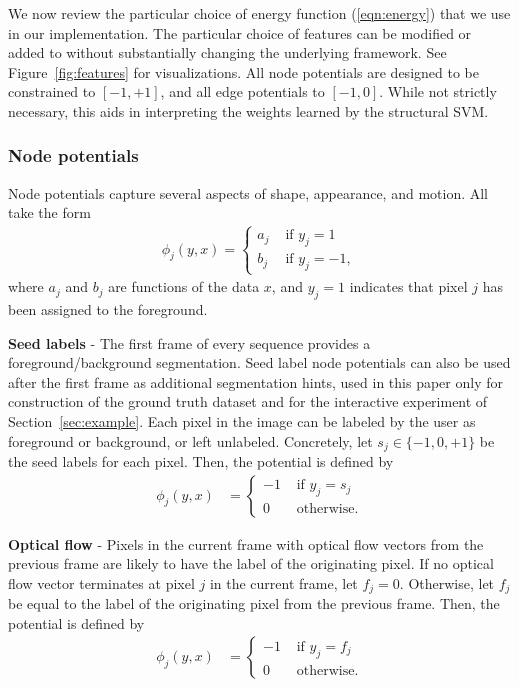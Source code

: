 \documentclass[journal]{IEEEtran}
\begin{document}
We now review the particular choice of energy function (\ref{eqn:energy}) that we use in our implementation. The particular choice of features can be modified or added to without substantially changing the underlying framework. See Figure~\ref{fig:features} for visualizations.  All node potentials are designed to be constrained to $[-1, +1]$, and all edge potentials to $[-1, 0]$.  While not strictly necessary, this aids in interpreting the weights learned by the structural SVM.

\subsubsection{Node potentials}
\label{sec:npot}
Node potentials capture several aspects of shape, appearance, and motion.  All take the form
\begin{align}
  \label{eqn:npot}
  \phi_j(y, x) = 
  \left\{
  \begin{array}{rl}
    a_j & \mbox{ if } y_j = 1 \\
    b_j & \mbox{ if } y_j = -1,
  \end{array} 
  \right.
\end{align}
where $a_j$ and $b_j$ are functions of the data $x$, and $y_j = 1$ indicates that pixel $j$ has been assigned to the foreground.

\textbf{Seed labels} - The first frame of every sequence provides a foreground/background segmentation.  Seed label node potentials can also be used after the first frame as additional segmentation hints, used in this paper only for construction of the ground truth dataset and for the interactive experiment of Section~\ref{sec:example}.  Each pixel in the image can be labeled by the user as foreground or background, or left unlabeled.  Concretely, let $s_j \in \{-1,0,+1\}$ be the seed labels for each pixel.  Then, the potential is defined by
\begin{align*}
  \phi_j(y, x) & =
  \left\{
  \begin{array}{rl}
    -1 & \mbox{ if } y_j = s_j \\
    0 & \mbox{ otherwise.}
  \end{array}
  \right.
\end{align*}

\textbf{Optical flow} - Pixels in the current frame with optical flow vectors from the previous frame are likely to have the label of the originating pixel.  If no optical flow vector terminates at pixel $j$ in the current frame, let $f_j = 0$.  Otherwise, let $f_j$ be equal to the label of the originating pixel from the previous frame.  Then, the potential is defined by
\begin{align*}
  \phi_j(y, x) & =
  \left\{
  \begin{array}{rl}
    -1 & \mbox{ if } y_j = f_j \\
    0 & \mbox{ otherwise.}
  \end{array}
  \right.
\end{align*}
\end{document}
